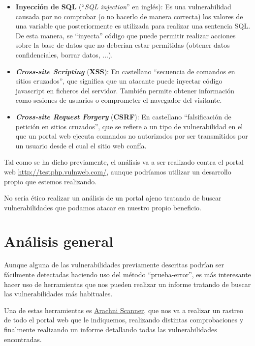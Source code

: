 \documentclass{\ClassPath/viu-tfm-template}
\begin{document}
\begin{itemize}
    \item \textbf{Inyección de SQL} (“\textit{SQL injection}” en inglés): Es una vulnerabilidad causada por no comprobar (o no hacerlo de  manera correcta) los valores de una variable que posteriormente es utilizada para realizar una sentencia SQL. De esta manera, se “inyecta” código que puede permitir realizar acciones sobre la base de datos que no deberían estar permitidas (obtener datos confidenciales, borrar datos, ...).

    \item \textbf{\textit{Cross-site Scripting}} (\textbf{XSS}): En castellano “secuencia de comandos en sitios cruzados”, que significa que un atacante puede inyectar código javascript en ficheros del servidor. También permite obtener información como sesiones de usuarios o comprometer el navegador del visitante.

    \item \textbf{\textit{Cross-site Request Forgery}} (\textbf{CSRF}): En castellano “falsificación de petición en sitios cruzados”, que se refiere a un tipo de  vulnerabilidad en el que un portal web ejecuta comandos no autorizados por ser transmitidos por un usuario desde el cual el sitio web confía.
\end{itemize}

Tal como se ha dicho previamente, el análisis va a ser realizado contra el portal web \href{http://testphp.vulnweb.com/}{http://testphp.vulnweb.com/}, aunque podríamos utilizar un desarrollo propio que estemos realizando.

No sería ético realizar un análisis de un portal ajeno tratando de buscar vulnerabilidades que podamos atacar en nuestro propio beneficio.


\chapter{Análisis general}

Aunque alguna de las vulnerabilidades previamente descritas podrían ser fácilmente detectadas haciendo uso del método “prueba-error”, es más interesante hacer uso de herramientas que nos pueden realizar un informe tratando de buscar las vulnerabilidades más habituales.

Una de estas herramientas es \href{https://www.arachni-scanner.com/}{Arachni Scanner}, que nos va a realizar un rastreo de todo el portal web que le indiquemos, realizando distintas comprobaciones y finalmente realizando un informe detallando todas las vulnerabilidades encontradas.
\end{document}
